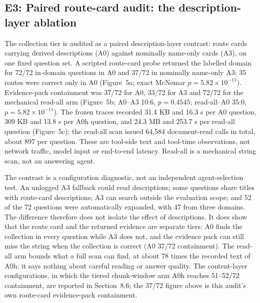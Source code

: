 \documentclass[11pt]{article}
\begin{document}
\subsection{E3: Paired route-card audit: the description-layer ablation}

The collection tier is audited as a paired description-layer contrast: route
cards carrying derived descriptions (A0) against nominally name-only cards
(A3), on one fixed question set. A scripted route-card probe returned the
labelled domain for 72/72 in-domain questions in A0 and 37/72 in nominally
name-only A3; 35 routes were correct only in A0
(Figure~5a; exact McNemar $p=5.82\times10^{-11}$).
Evidence-pack containment was 37/72 for A0, 33/72 for A3 and 72/72 for the
mechanical read-all arm (Figure~5b; A0--A3 10:6,
$p=0.4545$; read-all--A0 35:0, $p=5.82\times10^{-11}$). The frozen traces
recorded 31.4 KB and 16.3 s per A0 question, 309 KB and 13.8 s per A0h
question, and 24.3 MB and 253.7 s per read-all question
(Figure~5c); the read-all scan issued 64{,}584 document-read
calls in total, about 897 per question. These are tool-side text and
tool-time observations, not network traffic, model input or end-to-end
latency. Read-all is a mechanical string scan, not an answering agent.

The contrast is a configuration diagnostic, not an independent agent-selection
test. An unlogged A3 fallback could read descriptions; some questions share
titles with route-card descriptions; A3 can search outside the evaluation
scope; and 52 of the 72 questions were automatically expanded, with 47 from
three domains. The difference therefore does not isolate the effect of
descriptions. It does show that the route card and the returned evidence are
separate tiers: A0 finds the collection in every question while A3 does not,
and the evidence pack can still miss the string when the collection is
correct (A0 37/72 containment). The read-all arm bounds what a full scan can
find, at about 78 times the recorded text of A0h; it says nothing about
careful reading or answer quality. The content-layer configurations, in
which the tiered chunk-window arm A0h reaches 51--52/72 containment, are
reported in Section~8.6; the 37/72 figure above is this
audit's own route-card evidence-pack containment.
\end{document}
